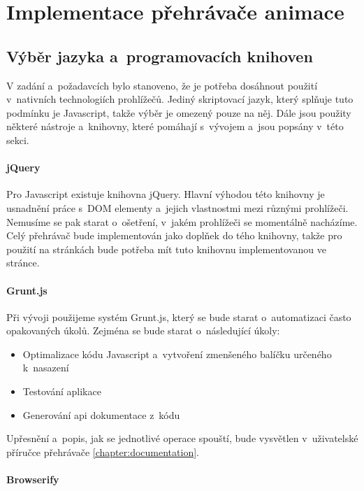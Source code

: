 \chapter{Implementace přehrávače animace}


\section{Výběr jazyka a~programovacích knihoven}


V zadání a~požadavcích bylo stanoveno, že je potřeba dosáhnout použití v~nativních technologiích prohlížečů. Jediný skriptovací jazyk, který splňuje tuto podmínku je Javascript, takže výběr je omezený pouze na něj. Dále jsou použity některé nástroje a~knihovny, které pomáhají s~vývojem a~jsou popsány v~této sekci.

\subsubsection*{jQuery}

Pro Javascript existuje knihovna jQuery. Hlavní výhodou této knihovny je usnadnění práce s~DOM elementy a~jejich vlastnostmi mezi různými prohlížeči. Nemusíme se pak starat o~ošetření, v~jakém prohlížeči se momentálně nacházíme. Celý přehrávač bude implementován jako doplňek do tého knihovny, takže pro použití na stránkách bude potřeba mít tuto knihovnu implementovanou ve stránce. 

\subsubsection*{Grunt.js}

Při vývoji použijeme systém Grunt.js, který se bude starat o~automatizaci často opakovaných úkolů. Zejména se bude starat o~následující úkoly:


\begin{itemize}
  \item Optimalizace kódu Javascript a~vytvoření zmenšeného balíčku určeného k~nasazení 
  \item Testování aplikace
  \item Generování api dokumentace z~kódu
\end{itemize}

Upřesnění a~popis, jak se jednotlivé operace spouští, bude vysvětlen v~uživatelské příručce přehrávače \ref{chapter:documentation}.

\subsubsection*{Browserify}

